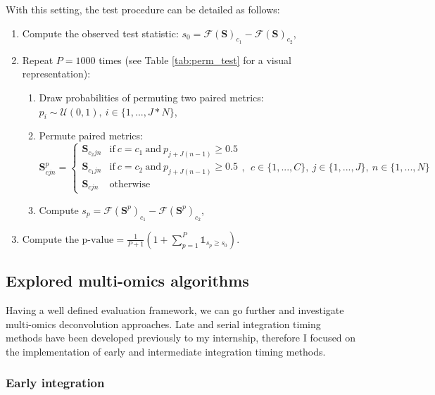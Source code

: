 \documentclass{article}
\begin{document}
With this setting, the test procedure can be detailed as follows:
\begin{enumerate}
    \item Compute the observed test statistic: $s_0 = \mathcal{F}(\mathbf{S})_{c_1} - \mathcal{F}(\mathbf{S})_{c_2}$,
    \item Repeat $P=1000$ times (see Table \ref{tab:perm_test} for a visual representation):
        \begin{enumerate}
            \item Draw probabilities of permuting two paired metrics: $p_i \sim \mathcal{U}(0,1), ~i \in \{1,...,J*N\}$,
            \item Permute paired metrics:
            $$\mathbf{S}^p_{cjn} = 
            \begin{cases}
              \mathbf{S}_{c_2jn} & \text{if} ~c = c_1 ~\text{and} ~p_{j+J(n-1)} \geq 0.5 \\
              \mathbf{S}_{c_1jn} & \text{if} ~c = c_2 ~\text{and} ~p_{j+J(n-1)} \geq 0.5 \\
              \mathbf{S}_{cjn} & \text{otherwise}
            \end{cases}
            , ~~c \in \{1,...,C\}, ~j \in \{1,...,J\}, ~n \in \{1,...,N\}
            $$
            \item Compute $s_p = \mathcal{F} \left( \mathbf{S}^p \right)_{c_1} - \mathcal{F} \left( \mathbf{S}^p \right)_{c_2}$,
        \end{enumerate}
    \item Compute the $\text{p-value} = \frac{1}{P + 1} (1 + \sum_{p=1}^P \mathds{1}_{s_p \geq s_0})$.
\end{enumerate}



\subsection{Explored multi-omics algorithms}\label{subsec:explored-multi-omics-algorithms}

Having a well defined evaluation framework, we can go further and investigate multi-omics deconvolution approaches.
Late and serial integration timing methods have been developed previously to my internship, therefore I focused on the implementation of early and intermediate integration timing methods.

\subsubsection{Early integration}\label{subsubsec:early-integration}
\end{document}
